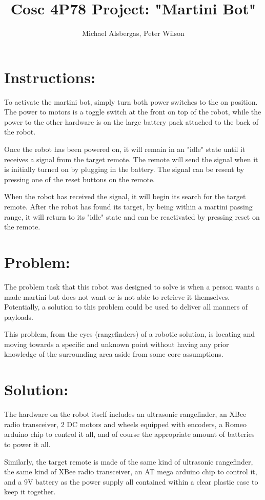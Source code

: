 \documentclass[]{article}
\title{Cosc 4P78 Project: "Martini Bot" }
\author{Michael Alsbergas, Peter Wilson}
\begin{document}
\maketitle

\section{Instructions: }
	To activate the martini bot, simply turn both power switches to the on position. The power to motors is a toggle switch at the front on top of the robot, while the power to the other hardware is on the large battery pack attached to the back of the robot. 
	
	Once the robot has been powered on, it will remain in an "idle" state until it receives a signal from the target remote. The remote will send the signal when it is initially turned on by plugging in the battery. The signal can be resent by pressing one of the reset buttons on the remote. 
	
	When the robot has received the signal, it will begin its search for the target remote. After the robot has found its target, by being within a martini passing range, it will return to its "idle" state and can be reactivated by pressing reset on the remote. 

\section{Problem: }
	The problem task that this robot was designed to solve is when a person wants a made martini but does not want or is not able to retrieve it themselves. Potentially, a solution to this problem could be used to deliver all manners of payloads. 
	
	This problem, from the eyes (rangefinders) of a robotic solution, is locating and moving towards a specific and unknown point without having any prior knowledge of the surrounding area aside from some core assumptions. 

\section{Solution: }
	The hardware on the robot itself includes an ultrasonic rangefinder, an XBee radio transceiver, 2 DC motors and wheels equipped with encoders, a Romeo arduino chip to control it all, and of course the appropriate amount of batteries to power it all. 
	
	Similarly, the target remote is made of the same kind of ultrasonic rangefinder, the same kind of XBee radio transceiver, an AT mega arduino chip to control it, and a 9V battery as the power supply all contained within a clear plastic case to keep it together. 
	
\end{document}
